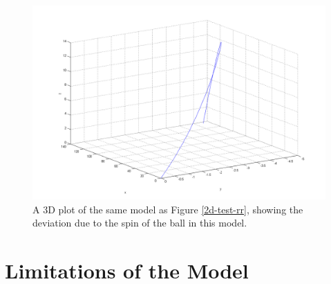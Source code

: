 \begin{figure}[h]
\centering
\includegraphics[scale=0.4]{../images/3d-rr.png}
\caption[3D plot of an example Robinson and Robinson model trajectory]{A 3D plot of the same model as
Figure \ref{2d-test-rr}, showing the deviation due to the spin of the ball in this model.}
\label{3d-test-rr}
\end{figure}

\pagebreak


\section{Limitations of the Model}

